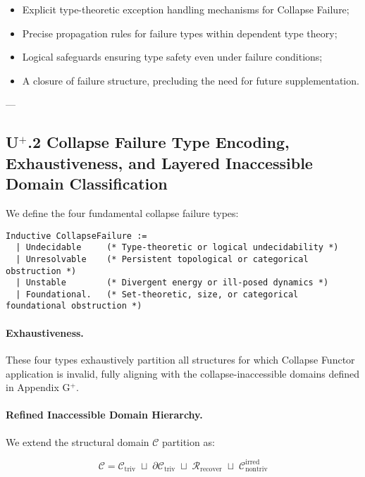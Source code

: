 \documentclass[11pt]{article}
\begin{document}
\begin{itemize}
    \item Explicit type-theoretic exception handling mechanisms for Collapse Failure;
    \item Precise propagation rules for failure types within dependent type theory;
    \item Logical safeguards ensuring type safety even under failure conditions;
    \item A closure of failure structure, precluding the need for future supplementation.
\end{itemize}

---

\subsection*{U$^{+}$.2 Collapse Failure Type Encoding, Exhaustiveness, and Layered Inaccessible Domain Classification}

We define the four fundamental collapse failure types:

\begin{lstlisting}[language=Coq]
Inductive CollapseFailure :=
  | Undecidable     (* Type-theoretic or logical undecidability *)
  | Unresolvable    (* Persistent topological or categorical obstruction *)
  | Unstable        (* Divergent energy or ill-posed dynamics *)
  | Foundational.   (* Set-theoretic, size, or categorical foundational obstruction *)
\end{lstlisting}

\paragraph{Exhaustiveness.} These four types exhaustively partition all structures for which Collapse Functor application is invalid, fully aligning with the collapse-inaccessible domains defined in Appendix G$^{+}$.

\paragraph{Refined Inaccessible Domain Hierarchy.}

We extend the structural domain $\mathcal{C}$ partition as:

\[
\mathcal{C} = \mathcal{C}_{\mathrm{triv}} \;\sqcup\; \partial \mathcal{C}_{\mathrm{triv}} \;\sqcup\; \mathcal{R}_{\mathrm{recover}} \;\sqcup\; \mathcal{C}_{\mathrm{nontriv}}^{\mathrm{irred}}
\]
\end{document}
